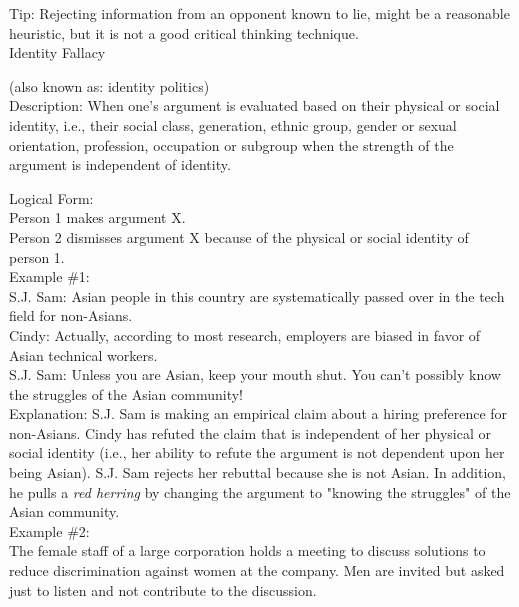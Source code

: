 \documentclass[a4paper,12pt,single,pdftex]{scrbook}
\begin{document}
    
      Tip: Rejecting information from an opponent known to lie, might be a reasonable heuristic, but it is not a good critical thinking technique.
    \\

  

Identity Fallacy
    
      (also known as: identity politics)
    \\

  
    Description: When one's argument is evaluated based on their physical or social identity, i.e., their social class, generation, ethnic group, gender or sexual orientation, profession, occupation or subgroup when the strength of the argument is independent of identity.

    
      Logical Form:
    \\

    
      Person 1 makes argument X.
    \\

    
      Person 2 dismisses argument X because of the physical or social identity of person 1.
    \\

    
      Example \#1:
    \\

    
      S.J. Sam: Asian people in this country are systematically passed over in the tech field for non-Asians.
    \\

    
      Cindy: Actually, according to most research, employers are biased in favor of Asian technical workers.
    \\

    
      S.J. Sam: Unless you are Asian, keep your mouth shut. You can't possibly know the struggles of the Asian community!
    \\

    
      Explanation: S.J. Sam is making an empirical claim about a hiring preference for non-Asians. Cindy has refuted the claim that is independent of her physical or social identity (i.e., her ability to refute the argument is not dependent upon her being Asian). S.J. Sam rejects her rebuttal because she is not Asian. In addition, he pulls a {\it red herring} by changing the argument to "knowing the struggles" of the Asian community.
    \\

    
      Example \#2:
    \\

    
      The female staff of a large corporation holds a meeting to discuss solutions to reduce discrimination against women at the company. Men are invited but asked just to listen and not contribute to the discussion.
    \\
\end{document}
